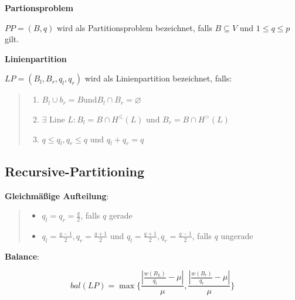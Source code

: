       \par \textbf{Partionsproblem}

      \par $PP = (B, q)$ wird als Partitionsproblem bezeichnet, falls $B \subseteq V$ und $1 \leq q \leq p$ gilt.\\
    
      \par \textbf{Linienpartition}

      \par $LP = (B_l, B_r, q_l, q_r)$ wird als Linienpartition bezeichnet, falls:
        \begin{quote}
          \begin{enumerate}
            \item $B_l \cup b_r = B \text{und} B_l \cap B_r = \varnothing$
            \item $\exists \text{ Line } L: B_l = B \cap H^{\leq}(L) \text{ und } B_r = B \cap H^{>}(L)$
            \item $q \leq q_l, q_r \leq q \text{ und } q_l + q_r = q$
          \end{enumerate}
        \end{quote}

    \subsection{Recursive-Partitioning} %
    \label{sub:recursive_partitioning}

      \par \textbf{Gleichmäßige Aufteilung}:

        \begin{quote}
          \begin{itemize}
            \item $q_l = q_r = \frac{q}{2}$, falls $q$ gerade
            \item $q_l = \frac{q - 1}{2}, q_r = \frac{q + 1}{2}$ und $q_l = \frac{q + 1}{2}, q_r = \frac{q - 1}{2}$, falls $q$ ungerade
          \end{itemize}
        \end{quote}

      \par \textbf{Balance}:

      \begin{equation*}
        bal(LP) = \max \{ \frac{|\frac{w(B_L)}{q_l} - \mu|}{\mu}, \frac{|\frac{w(B_r)}{q_r} - \mu|}{\mu}\}
      \end{equation*}

